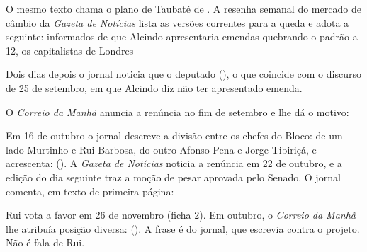 
O mesmo texto chama o plano de Taubaté de . A resenha semanal do mercado de câmbio da \textit{Gazeta de
Notícias} lista as versões correntes para a queda e adota a seguinte: informados
de que Alcindo apresentaria emendas quebrando o padrão a 12, os capitalistas de
Londres


Dois dias depois o jornal noticia que o deputado  (), o que coincide com o discurso de 25 de setembro, em que Alcindo diz
não ter apresentado emenda.


O \textit{Correio da Manhã} anuncia a renúncia no fim de setembro e lhe dá o
motivo:


Em 16 de outubro o jornal descreve a divisão entre os chefes do Bloco: de um
lado Murtinho e Rui Barbosa, do outro Afonso Pena e Jorge Tibiriçá, e
acrescenta: 
(). A \textit{Gazeta de
Notícias} noticia a renúncia em 22 de outubro, e a edição do dia seguinte traz a
moção de pesar aprovada pelo Senado. O jornal comenta, em texto de primeira
página:



Rui vota a favor em 26 de novembro (ficha 2). Em outubro, o \textit{Correio da
Manhã} lhe atribuía posição diversa: 
(). A frase é do jornal, que
escrevia contra o projeto. Não é fala de Rui.

